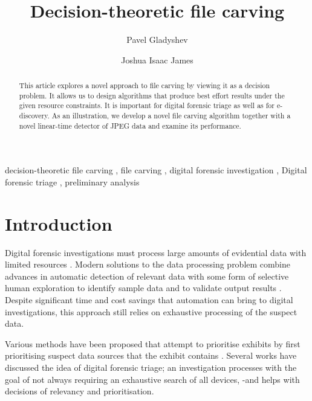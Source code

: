 \documentclass[final,5p,times,twocolumn,authoryear]{elsarticle}
\begin{document}
\begin{frontmatter}

\title{Decision-theoretic file carving}

\author[add1]{Pavel Gladyshev}
\author[add2]{Joshua Isaac James}
\address[add1]{Digital Forensics Investigation Research Laboratory, University College Dublin, Belfield, Dublin 4, Ireland}
\address[add2]{Digital Forensics Investigation Research Laboratory, Hallym University, 1 Hallimdaehak-gil, Chuncheon-si, Gangwon-do, South Korea}
\begin{abstract}
This article explores a novel approach to file carving by viewing it as a decision problem. It allows us to design algorithms that produce best effort results under the given resource constraints. It is important for digital forensic triage as well as for e-discovery. As an illustration, we develop a novel file carving algorithm together with a novel linear-time detector of JPEG data and examine its performance.
\end{abstract}

\begin{keyword}
decision-theoretic file carving \sep 
file carving \sep 
digital forensic investigation \sep 
Digital forensic triage \sep
preliminary analysis
\end{keyword}
\end{frontmatter}

\section{Introduction}

Digital forensic investigations must process large amounts of evidential data with limited resources \cite{Casey2009, pollitt2013triage}. Modern solutions to the data processing problem combine advances in automatic detection of relevant data with some form of selective human exploration to identify sample data and to validate output results \cite{marturana2013machine, schell2007cyber, james2014measuring}. Despite significant time and cost savings that automation can bring to digital investigations, this approach still relies on exhaustive processing of the suspect data.

Various methods have been proposed that attempt to prioritise exhibits by first prioritising suspect data sources that the exhibit contains \cite{shaw2013practical, rogers2003role, overill2013triage}. Several works \cite{Koopmans2013,Casey2009} have discussed the idea of digital forensic triage; an investigation processes with the goal of not always requiring an exhaustive search of all devices, -and helps with decisions of relevancy and prioritisation.
\end{document}
